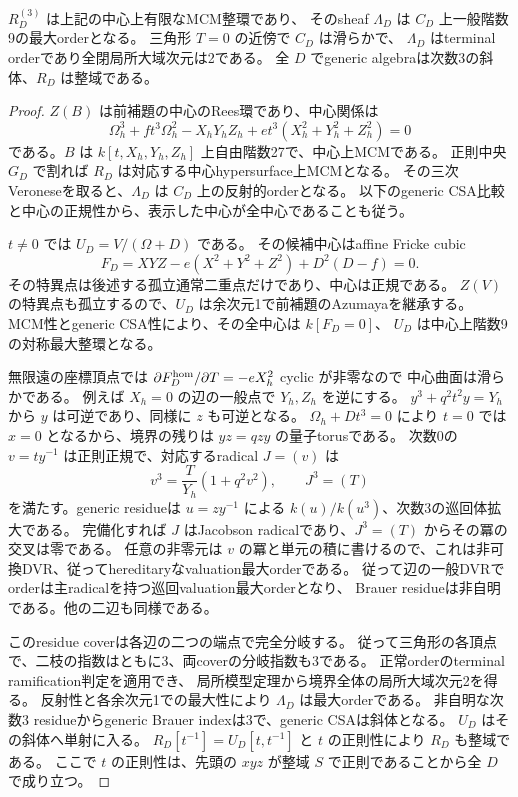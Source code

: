 \begin{lemma}
\label{lem:quantum-triangle-terminal-boundary}
$R_D^{(3)}$ は上記の中心上有限なMCM整環であり、
そのsheaf $\Lambda_D$ は $C_D$ 上一般階数9の最大orderとなる。
三角形 $T=0$ の近傍で $C_D$ は滑らかで、
$\Lambda_D$ はterminal orderであり全閉局所大域次元は2である。
全 $D$ でgeneric algebraは次数3の斜体、$R_D$ は整域である。
\end{lemma}
\begin{proof}
$Z(B)$ は前補題の中心のRees環であり、中心関係は
\[
 \Omega_h^3+ft^3\Omega_h^2-X_hY_hZ_h
       +et^3(X_h^2+Y_h^2+Z_h^2)=0
\]
である。$B$ は $k[t,X_h,Y_h,Z_h]$ 上自由階数27で、中心上MCMである。
正則中央 $G_D$ で割れば $R_D$ は対応する中心hypersurface上MCMとなる。
その三次Veroneseを取ると、$\Lambda_D$ は $C_D$ 上の反射的orderとなる。
以下のgeneric CSA比較と中心の正規性から、表示した中心が全中心であることも従う。

$t\ne0$ では $U_D=V/(\Omega+D)$ である。
その候補中心はaffine Fricke cubic
\[
 F_D=XYZ-e(X^2+Y^2+Z^2)+D^2(D-f)=0.
\]
その特異点は後述する孤立通常二重点だけであり、中心は正規である。
$Z(V)$ の特異点も孤立するので、$U_D$ は余次元1で前補題のAzumayaを継承する。
MCM性とgeneric CSA性により、その全中心は $k[F_D=0]$、
$U_D$ は中心上階数9の対称最大整環となる。

無限遠の座標頂点では $\partial F_D^{\rm hom}/\partial T=-eX_h^2$ cyclic が非零なので
中心曲面は滑らかである。
例えば $X_h=0$ の辺の一般点で $Y_h,Z_h$ を逆にする。
$y^3+q^2t^2y=Y_h$ から $y$ は可逆であり、同様に $z$ も可逆となる。
$\Omega_h+Dt^3=0$ により $t=0$ では $x=0$ となるから、境界の残りは
$yz=qzy$ の量子torusである。
次数0の $v=ty^{-1}$ は正則正規で、対応するradical $J=(v)$ は
\[
 v^3=\frac{T}{Y_h}(1+q^2v^2),\qquad J^3=(T)
\]
を満たす。generic residueは $u=zy^{-1}$ による
$k(u)/k(u^3)$、次数3の巡回体拡大である。
完備化すれば $J$ はJacobson radicalであり、$J^3=(T)$ からその冪の交叉は零である。
任意の非零元は $v$ の冪と単元の積に書けるので、これは非可換DVR、従ってhereditaryなvaluation最大orderである。
従って辺の一般DVRでorderは主radicalを持つ巡回valuation最大orderとなり、
Brauer residueは非自明である。他の二辺も同様である。

このresidue coverは各辺の二つの端点で完全分岐する。
従って三角形の各頂点で、二枝の指数はともに3、両coverの分岐指数も3である。
正常orderのterminal ramification判定\cite[Theorem 2.7]{CHIOrders}を適用でき、
局所模型定理\cite[Theorem 2.17]{CHIOrders}から境界全体の局所大域次元2を得る。
反射性と各余次元1での最大性により $\Lambda_D$ は最大orderである。
非自明な次数3 residueからgeneric Brauer indexは3で、generic CSAは斜体となる。
$U_D$ はその斜体へ単射に入る。
$R_D[t^{-1}]=U_D[t,t^{-1}]$ と $t$ の正則性により $R_D$ も整域である。
ここで $t$ の正則性は、先頭の $xyz$ が整域 $S$ で正則であることから全 $D$ で成り立つ。
\end{proof}

